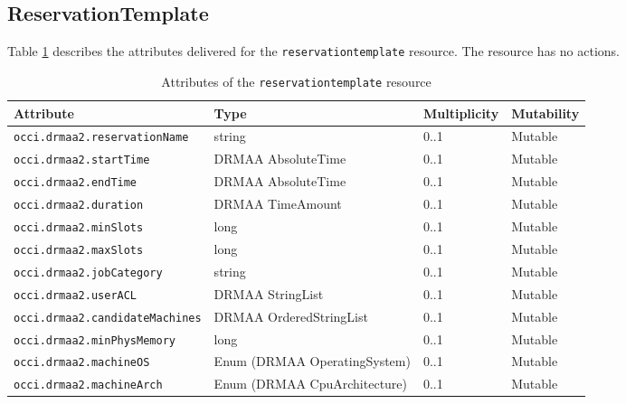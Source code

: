 \documentclass[10pt]{article}
\newcommand{\h}[1]{\lstinline|#1|}
\newcommand{\rat}[1]{}
\begin{document}
\subsection{ReservationTemplate}
Table \ref{tab:reservationtemplateattributes} describes the attributes delivered for the \h{reservationtemplate} resource. The resource has no actions.

\begin{table}[ht]
\centering
\begin{tabularx}{\textwidth}{|l|l|X|l|}
\hline 
Attribute           & Type                         & Multiplicity & Mutability \\
\hline
\h{occi.drmaa2.reservationName}     & string                       & 0..1         & Mutable   \\
\h{occi.drmaa2.startTime}           & DRMAA AbsoluteTime           & 0..1         & Mutable   \\
\h{occi.drmaa2.endTime}             & DRMAA AbsoluteTime           & 0..1         & Mutable   \\
\h{occi.drmaa2.duration}            & DRMAA TimeAmount             & 0..1         & Mutable   \\
\h{occi.drmaa2.minSlots}            & long                         & 0..1         & Mutable   \\ 
\h{occi.drmaa2.maxSlots}            & long                         & 0..1         & Mutable   \\ 
\h{occi.drmaa2.jobCategory}         & string                       & 0..1         & Mutable   \\
\h{occi.drmaa2.userACL}             & DRMAA StringList             & 0..1         & Mutable   \\
\h{occi.drmaa2.candidateMachines}   & DRMAA OrderedStringList      & 0..1         & Mutable   \\ 
\h{occi.drmaa2.minPhysMemory}       & long                         & 0..1         & Mutable   \\ 
\h{occi.drmaa2.machineOS}           & Enum (DRMAA OperatingSystem) & 0..1         & Mutable   \\
\h{occi.drmaa2.machineArch}         & Enum (DRMAA CpuArchitecture) & 0..1         & Mutable   \\
\hline
\end{tabularx}
\caption{Attributes of the \h{reservationtemplate} resource}
\label{tab:reservationtemplateattributes}
\end{table}

\rat{DRMAA says that all attributes may have the value UNSET on submission, which maps to mupliplicity zero.}
\end{document}
